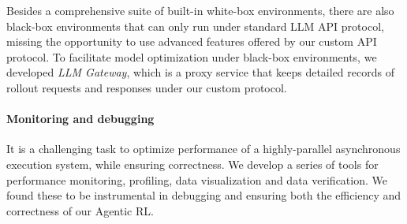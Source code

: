 Besides a comprehensive suite of built-in white-box environments, there are also black-box environments that can only run under standard LLM API protocol, missing the opportunity to use advanced features offered by our custom API protocol. To facilitate model optimization under black-box environments, 
we developed \textit{LLM Gateway}, which is a proxy service that keeps detailed records of rollout requests and responses under our custom protocol.  

\paragraph{Monitoring and debugging} It is a challenging task to optimize performance of a highly-parallel asynchronous execution system, while ensuring correctness. We develop a series of tools for performance monitoring, profiling, data visualization and data verification. We found these to be instrumental in debugging and ensuring both the efficiency and correctness of our Agentic RL.
